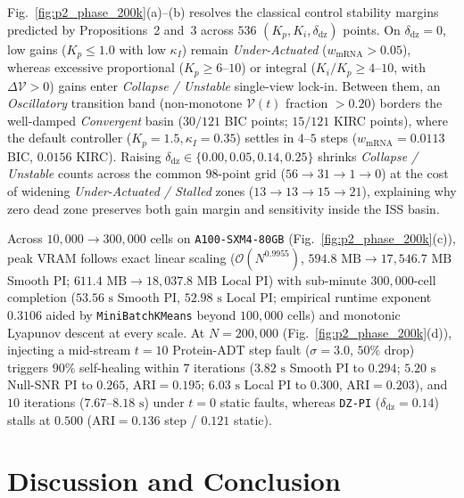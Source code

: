 \documentclass[journal]{IEEEtran}
\begin{document}
Fig.~\ref{fig:p2_phase_200k}(a)--(b) resolves the classical control stability margins predicted by Propositions~2 and~3 across $536$ $(K_p, K_i, \delta_{\mathrm{dz}})$ points. On $\delta_{\mathrm{dz}}=0$, low gains ($K_p \le 1.0$ with low $\kappa_I$) remain \emph{Under-Actuated} ($w_{\mathrm{mRNA}} > 0.05$), whereas excessive proportional ($K_p \ge 6\text{--}10$) or integral ($K_i/K_p \ge 4\text{--}10$, with $\Delta\mathcal{V} > 0$) gains enter \emph{Collapse / Unstable} single-view lock-in. Between them, an \emph{Oscillatory} transition band (non-monotone $\mathcal{V}(t)$ fraction $>0.20$) borders the well-damped \emph{Convergent} basin ($30/121$ BIC points; $15/121$ KIRC points), where the default controller ($K_p=1.5, \kappa_I=0.35$) settles in $4\text{--}5$ steps ($w_{\mathrm{mRNA}}=0.0113$ BIC, $0.0156$ KIRC). Raising $\delta_{\mathrm{dz}} \in \{0.00, 0.05, 0.14, 0.25\}$ shrinks \emph{Collapse / Unstable} counts across the common $98$-point grid ($56 \rightarrow 31 \rightarrow 1 \rightarrow 0$) at the cost of widening \emph{Under-Actuated / Stalled} zones ($13 \rightarrow 13 \rightarrow 15 \rightarrow 21$), explaining why zero dead zone preserves both gain margin and sensitivity inside the ISS basin.

Across $10{,}000 \rightarrow 300{,}000$ cells on \texttt{A100-SXM4-80GB} (Fig.~\ref{fig:p2_phase_200k}(c)), peak VRAM follows exact linear scaling ($\mathcal{O}(N^{0.9955})$, $594.8\text{ MB} \rightarrow 17{,}546.7\text{ MB}$ Smooth PI; $611.4\text{ MB} \rightarrow 18{,}037.8\text{ MB}$ Local PI) with sub-minute $300{,}000$-cell completion ($53.56\text{ s}$ Smooth PI, $52.98\text{ s}$ Local PI; empirical runtime exponent $0.3106$ aided by \texttt{MiniBatchKMeans} beyond $100{,}000$ cells) and monotonic Lyapunov descent at every scale. At $N=200{,}000$ (Fig.~\ref{fig:p2_phase_200k}(d)), injecting a mid-stream $t=10$ Protein-ADT step fault ($\sigma=3.0$, $50\%$ drop) triggers $90\%$ self-healing within $7$ iterations ($3.82\text{ s}$ Smooth PI to $0.294$; $5.20\text{ s}$ Null-SNR PI to $0.265$, $\mathrm{ARI}=0.195$; $6.03\text{ s}$ Local PI to $0.300$, $\mathrm{ARI}=0.203$), and $10$ iterations ($7.67\text{--}8.18\text{ s}$) under $t=0$ static faults, whereas \texttt{DZ-PI} ($\delta_{\mathrm{dz}}=0.14$) stalls at $0.500$ ($\mathrm{ARI}=0.136$ step / $0.121$ static).

\section{Discussion and Conclusion}
\end{document}
